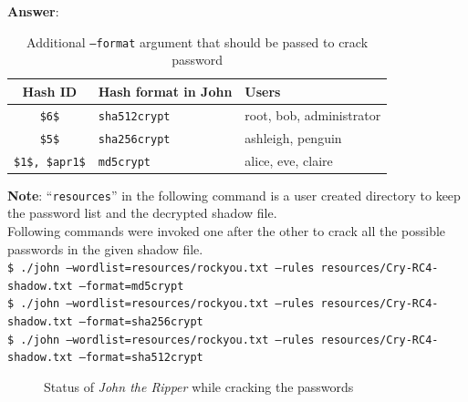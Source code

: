 \documentclass[11pt,letterpaper]{article}
\begin{document}
\begin{enumerate}
		\textbf{\Large Answer}:
		\begin{table}[!h]
			\centering
			\begin{tabular}{|c | l | l |}
				\hline
		\textbf{Hash ID} & \textbf{Hash format in John} & \textbf{Users}\\\hline
		{\tt \$6\$} & {\tt sha512crypt} & root, bob, administrator\\
		{\tt \$5\$} & {\tt sha256crypt} & ashleigh, penguin\\
		{\tt \$1\$, \$apr1\$} & {\tt md5crypt} & alice, eve, claire\\
		\hline\hline		
			\end{tabular}
		\caption{Additional {\tt --format} argument that should be passed to crack password}
		\end{table}
		
		\textbf{Note}:  ``{\tt resources}'' in the following command is a user created directory to keep the password list and the decrypted shadow file.\\
	
		Following commands were invoked one after the other to crack all the possible passwords in the given shadow file.\\
		
		{\footnotesize \tt \$ ./john --wordlist=resources/rockyou.txt --rules resources/Cry-RC4-shadow.txt --format=md5crypt}\\
		{\footnotesize \tt \$ ./john --wordlist=resources/rockyou.txt --rules resources/Cry-RC4-shadow.txt --format=sha256crypt}\\
		{\footnotesize \tt \$ ./john --wordlist=resources/rockyou.txt --rules resources/Cry-RC4-shadow.txt --format=sha512crypt}
		
		 \begin{figure}[H]
		 	\centering
		 	\caption{Status of \textit{John the Ripper} while cracking the passwords }
		 \end{figure}
		

\end{enumerate}
\end{document}
